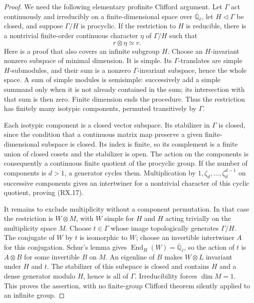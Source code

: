 \begin{proof}
We need the following elementary profinite Clifford argument.
Let $\Gamma$ act continuously and irreducibly on a finite-dimensional
space over $\overline{\mathbb Q}_\ell$, let $H\lhd\Gamma$ be closed,
and suppose $\Gamma/H$ is procyclic.  If the restriction to $H$ is
reducible, there is a nontrivial finite-order continuous character
$\eta$ of $\Gamma/H$ such that
\[
                          r\otimes\eta\simeq r.
 \tag{RX.17}
\]
Here is a proof that also covers an infinite subgroup $H$.
Choose an $H$-invariant nonzero subspace of minimal dimension.  It
is simple.  Its $\Gamma$-translates are simple $H$-submodules, and
their sum is a nonzero $\Gamma$-invariant subspace, hence the whole
space.  A sum of simple modules is semisimple: successively add a
simple summand only when it is not already contained in the sum;
its intersection with that sum is then zero.  Finite dimension
ends the procedure.  Thus the restriction has finitely many
isotypic components, permuted transitively by $\Gamma$.

Each isotypic component is a closed vector subspace.  Its stabilizer
in $\Gamma$ is closed, since the condition that a continuous matrix
map preserve a given finite-dimensional subspace is closed.  Its
index is finite, so its complement is a finite union of closed
cosets and the stabilizer is open.  The action on the components
is consequently a continuous finite quotient of the procyclic
group.  If the number of components is $d>1$, a generator cycles
them.  Multiplication by $1,\zeta_d,\ldots,\zeta_d^{d-1}$ on
successive components gives an intertwiner for a nontrivial
character of this cyclic quotient, proving (RX.17).

It remains to exclude multiplicity without a component permutation.
In that case the restriction is $W\otimes M$, with $W$ simple for
$H$ and $H$ acting trivially on the multiplicity space $M$.
Choose $t\in\Gamma$ whose image topologically generates
$\Gamma/H$.  The conjugate of $W$ by $t$ is isomorphic to $W$;
choose an invertible intertwiner $A$ for this conjugation.
Schur's lemma gives $\operatorname{End}_H(W)=
\overline{\mathbb Q}_\ell$, so the action of $t$ is $A\otimes B$
for some invertible $B$ on $M$.
An eigenline of $B$ makes $W\otimes L$ invariant under $H$ and $t$.
The stabilizer of this subspace is closed and contains $H$ and a
dense generator modulo $H$, hence is all of $\Gamma$.
Irreducibility forces $\dim M=1$.  This proves the assertion, with
no finite-group Clifford theorem silently applied to an infinite
group.


\end{proof}
